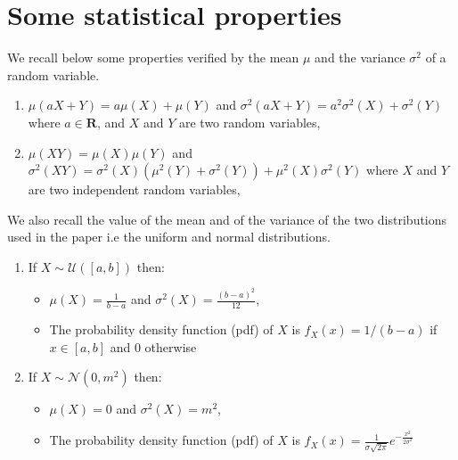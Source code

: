 \documentclass[AMS,STIX1COL]{WileyNJD-v2}
\begin{document}
\section{Some statistical properties}\label{appendixA}
We recall below some properties verified by the mean $\mu$ and the variance $\sigma^2$ of a random variable.
\begin{enumerate}[label=Property \arabic*.,itemindent=*]
  \item $\mu(aX + Y) = a\mu(X) + \mu(Y)$ and $\sigma^2(aX+Y) = a^2\sigma^2(X) + \sigma^2(Y)$ where $a \in \mathbf{R}$, and $X$ and $Y$ are two random variables,
  \item $\mu(XY) = \mu(X) \mu(Y)$ and $\sigma^2(XY) = \sigma^2(X) \left(\mu^2(Y) + \sigma^2(Y)\right) + \mu^2(X)\sigma^2(Y)$ where $X$ and $Y$ are two independent random variables,
\end{enumerate}
We also recall the value of the mean and of the variance of the two distributions used in the paper i.e the uniform and normal distributions. 
\begin{enumerate}
  \item If $X \sim \mathcal{U}([a,b])$ then:
  \begin{itemize}
      \item $\mu(X) = \frac{1}{b - a}$ and  $\sigma^2(X) = \frac{(b - a)^2}{12} $,
      \item The  probability density function (pdf) of $X$ is $f_X(x) = 1/(b-a)$ if $x \in [a,b]$ and $0$ otherwise
  \end{itemize}
   
  \item If $X \sim \mathcal N (0, m^2)$ then:
   \begin{itemize}
      \item $\mu(X) = 0$ and  $\sigma^2(X) = m^2$, 
      \item The  probability density function (pdf) of $X$ is $f_X(x) = \frac{1}{\sigma \sqrt{2\pi}}e^{-\frac{x^2}{2\sigma^2}}$
  \end{itemize}
\end{enumerate}






















\end{document}
